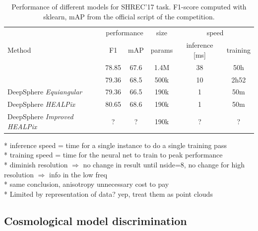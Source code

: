 \documentclass{article} %
\newcommand{\todo}[1]{{\color[rgb]{.6,.1,.6}{#1}}}
\begin{document}
\begin{table}
    \centering
    \begin{tabular}{l|c c c c c}
        \multicolumn{1}{l}{} & \multicolumn{2}{c}{performance} & \multicolumn{1}{c}{size} & \multicolumn{2}{c}{speed}\\
        \cmidrule(lr){2-3} \cmidrule(lr){4-4} \cmidrule(lr){5-6}
        \multicolumn{1}{l}{Method} & F1 & mAP & params & inference [ms] & training \\ \hline
        \cite{cohen_spherical_2018} & 78.85 & 67.6 & 1.4M & 38 & 50h\\
        \cite{esteves_learning_2017} & 79.36 & 68.5 & 500k & 10 & 2h52\\ \hline
        DeepSphere \emph{Equiangular} & 79.36 & 66.5 & 190k & 1 & 50m \\
        DeepSphere \emph{HEALPix} & 80.65 & 68.6 & 190k & 1 & 50m\\
        DeepSphere \emph{Improved HEALPix} & ? & ? & 190k & ? & ?
    \end{tabular}
    \caption{Performance of different models for SHREC'17 task. F1-score computed with sklearn, mAP from the official script of the competition.}
    \label{tab:SHREC17_class}
\end{table}

* inference speed = time for a single instance to do a single training pass\\
* training speed = time for the neural net to train to peak performance\\

* diminish resolution $\Rightarrow$ no change in result until nside=8, no change for high resolution $\Rightarrow$ info in the low freq\\
* same conclusion, anisotropy unnecessary cost to pay\\
* Limited by representation of data? yep, treat them as point clouds \\

\subsection{Cosmological model discrimination}

\todo{
* other sphercial CNNs cannot scale to 10M pixels (tested on 10k at most) \\
* redo the experiment with the optimal graph \\
}
\end{document}
